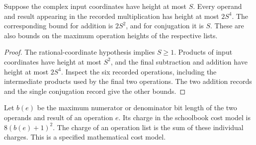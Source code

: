 \begin{lemma}
    \label{lem:lvv_recorded_complex_operation_heights}
    \leanok
    Suppose the complex input coordinates have height at most $S$.
    Every operand and result appearing in the recorded multiplication
    has height at most $2S^4$. The corresponding bound for addition
    is $2S^2$, and for conjugation it is $S$. These are also bounds
    on the maximum operation heights of the respective lists.
\end{lemma}
\begin{proof}\leanok
    The rational-coordinate hypothesis implies $S\ge1$. Products of
    input coordinates have height at most $S^2$, and the final
    subtraction and addition have height at most $2S^4$.
    Inspect the six recorded operations, including the intermediate
    products used by the final two operations. The two addition
    records and the single conjugation record give the other bounds.
\end{proof}

\begin{definition}
    \label{def:lvv_recorded_arithmetic_schoolbook_charge}
    \leanok
    Let $b(e)$ be the maximum numerator or denominator bit length
    of the two operands and result of an operation $e$. Its charge
    in the schoolbook cost model is $8(b(e)+1)^2$. The charge of an
    operation list is the sum of these individual charges. This is
    a specified mathematical cost model.
\end{definition}

